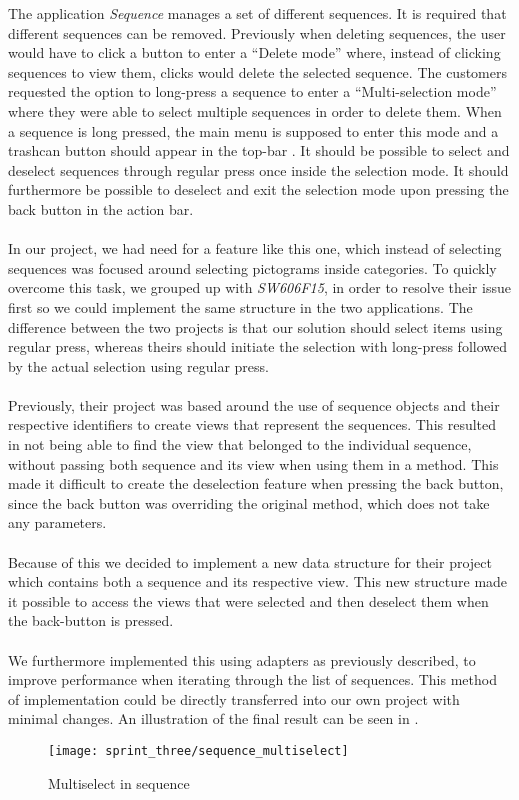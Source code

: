 The application \emph{Sequence} manages a set of different sequences. It is required that different sequences can be removed. Previously when deleting sequences, the user would have to click a button to enter a ``Delete mode'' where, instead of clicking sequences to view them, clicks would delete the selected sequence. The customers requested the option to long-press a sequence to enter a ``Multi-selection mode'' where they were able to select multiple sequences in order to delete them. When a sequence is long pressed, the main menu is supposed to enter this mode and a trashcan button should appear in the top-bar . It should be possible to select and deselect sequences through regular press once inside the selection mode. It should furthermore be possible to deselect and exit the selection mode upon pressing the back button in the action bar. 
\\\\
In our project, we had need for a feature like this one, which instead of selecting sequences was focused around selecting pictograms inside categories. To quickly overcome this task, we grouped up with \emph{SW606F15}, in order to resolve their issue first so we could implement the same structure in the two applications. The difference between the two projects is that our solution should select items using regular press, whereas theirs should initiate the selection with long-press followed by the actual selection using regular press.
\\\\
Previously, their project was based around the use of sequence objects and their respective identifiers to create views that represent the sequences. This resulted in not being able to find the view that belonged to the individual sequence, without passing both sequence and its view when using them in a method. This made it difficult to create the deselection feature when pressing the back button, since the back button was overriding the original  method, which does not take any parameters.
\\\\ 
Because of this we decided to implement a new data structure for their project which contains both a sequence and its respective view. This new structure made it possible to access the views that were selected and then deselect them when the back-button is pressed. 
\\\\
We furthermore implemented this using adapters as previously described, to improve performance when iterating through the list of sequences. This method of implementation could be directly transferred into our own project with minimal changes. An illustration of the final result can be seen in .

\begin{figure}[!htbp]
	\centering
	\texttt{[image: sprint\_three/sequence\_multiselect]}
	\caption{Multiselect in sequence}
	\label{fig:sequence_multiselect}
\end{figure}